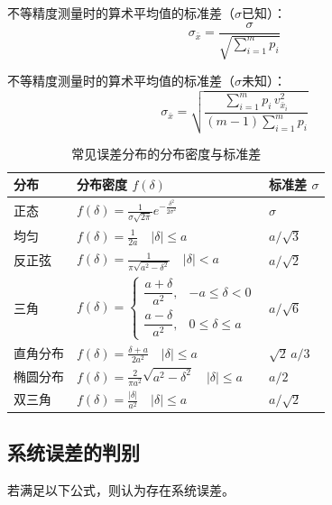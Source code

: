 \documentclass[12pt,a4paper]{ctexart}
\begin{document}
不等精度测量时的算术平均值的标准差（$\sigma$已知）：
\begin{equation*}
\sigma_{\bar{x}}=\frac{\sigma}{\sqrt{\sum_{i=1}^m p_i}}
\end{equation*}

不等精度测量时的算术平均值的标准差（$\sigma$未知）：
\begin{equation*}
\sigma_{\bar{x}}=\sqrt{\dfrac{\sum_{i=1}^{m}p_i\,v_{\bar{x}_i}^2}{(m-1)\sum_{i=1}^{m}p_i}}
\end{equation*}

\begin{table}[htbp]
\centering
\caption{常见误差分布的分布密度与标准差}
\renewcommand{\arraystretch}{2.0}
\setlength{\tabcolsep}{16pt}
\begin{tabular}{lll}
\hline
分布 & 分布密度 $f(\delta)$ & 标准差 $\sigma$ \\
\hline
正态
&
$\displaystyle f(\delta)=\frac{1}{\sigma\sqrt{2\pi}}e^{-\frac{\delta^2}{2\sigma^2}}$
&
$\displaystyle \sigma$
\\
均匀
&
$\displaystyle f(\delta)=\frac{1}{2a}\quad |\delta|\le a$
&
$\displaystyle a/\sqrt{3}$
\\
反正弦
&
$\displaystyle f(\delta)=\frac{1}{\pi\sqrt{a^2-\delta^2}}\quad |\delta|<a$
&
$\displaystyle a/\sqrt{2}$
\\
三角
&
$\displaystyle
f(\delta)=
\begin{cases}
\dfrac{a+\delta}{a^2}, & -a\le \delta<0 \\[8pt]
\dfrac{a-\delta}{a^2}, & 0\le \delta\le a
\end{cases}$
&
$\displaystyle a/\sqrt{6}$
\\
直角分布
&
$\displaystyle f(\delta)=\frac{\delta+a}{2a^2}\quad |\delta|\le a$
&
$\displaystyle \sqrt{2}\,a/3$
\\
椭圆分布
&
$\displaystyle f(\delta)=\frac{2}{\pi a^2}\sqrt{a^2-\delta^2}\quad |\delta|\le a$
&
$\displaystyle a/2$
\\
双三角
&
$\displaystyle f(\delta)=\frac{|\delta|}{a^2}\quad |\delta|\le a$
&
$\displaystyle a/\sqrt{2}$
\\
\hline
\end{tabular}
\end{table}

\newpage

\subsection{系统误差的判别}

若满足以下公式，则认为存在系统误差。
\end{document}
